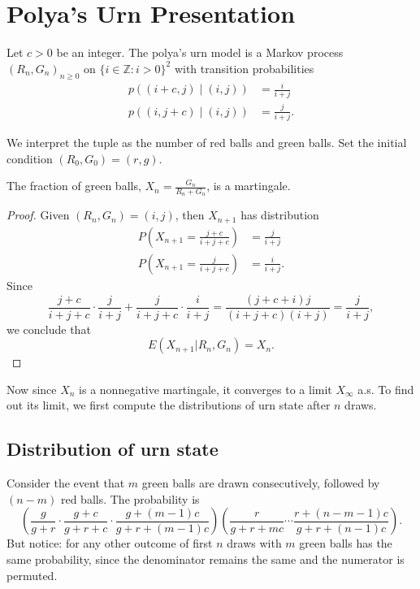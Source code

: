 
\section{Polya's Urn Presentation}


\begin{definition}
	Let $c>0$ be an integer. The polya's urn model is a Markov process $(R_n, G_n)_{n\ge 0}$ on $\{i \in \mathbb{Z}: i > 0\} ^2$ with transition probabilities
	\begin{align*}
		p\left((i+c, j) \middle| (i,j) \right) &= \frac{i}{i+j}\\
		p\left((i, j+c) \middle| (i,j) \right) &= \frac{j}{i+j}
	.\end{align*}
\end{definition} 

We interpret the tuple as the number of red balls and green balls. Set the initial condition $(R_0, G_0) = (r, g)$. 
\begin{claim}
	The fraction of green balls, $X_n = \frac{G_n}{R_n + G_n}$, is a martingale.
\end{claim}
\begin{proof}
	Given $(R_n, G_n) = (i,j)$, then $X_{n+1}$ has distribution
	\begin{align*}
		P\left(X_{n+1} = \frac{j+c}{i + j + c}\right) &= \frac{j}{i + j}\\
		P\left(X_{n+1} = \frac{j}{i + j + c}\right) &= \frac{i}{i + j}
	.\end{align*}
	Since
	\[
		\frac{j+c}{i+j+c} \cdot \frac{j}{i+j}+\frac{j}{i+j+c} \cdot \frac{i}{i+j}=\frac{(j+c+i) j}{(i+j+c)(i+j)}=\frac{j}{i+j}
	,\] 
	we conclude that
	\[
		E(X_{n+1} | R_n, G_n) = X_n
	.\] 
\end{proof}

Now since $X_n$ is a nonnegative martingale, it converges to a limit $X_\infty $ a.s. To find out its limit, we first compute the distributions of urn state after $n$ draws.

\subsection{Distribution of urn state}

Consider the event that $m$ green balls are drawn consecutively, followed by $(n-m)$ red balls. The probability is
	\[
		\left( \frac{g}{g+r} \cdot \frac{g+c}{g + r + c} \cdot \frac{g + (m - 1) c}{g + r + (m-1) c} \right) 
		\left( \frac{r}{g + r + m c} \cdots \frac{r + (n - m - 1) c}{g + r + (n-1)c}  \right) 
	.\] 
But notice: for any other outcome of first $n$ draws with $m$ green balls has the same probability, since the denominator remains the same and the numerator is permuted.

